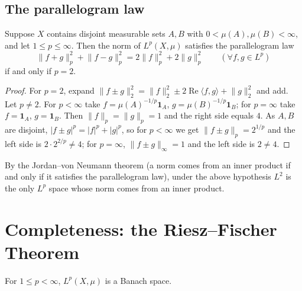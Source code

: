 \documentclass[11pt]{article}
\newcommand{\norm}[1]{\lVert #1\rVert}
\newcommand{\ind}{\mathbf{1}}
\begin{document}
\subsection{The parallelogram law}

\begin{proposition}\label{prop:parallelogram}
Suppose $X$ contains disjoint measurable sets $A,B$ with $0<\mu(A),\mu(B)<\infty$, and let $1\le p\le\infty$. Then the norm of $L^{p}(X,\mu)$ satisfies the parallelogram law
\[
\norm{f+g}_{p}^{2}+\norm{f-g}_{p}^{2}=2\norm{f}_{p}^{2}+2\norm{g}_{p}^{2}\qquad(\forall f,g\in L^{p})
\]
if and only if $p=2$.
\end{proposition}

\begin{proof}
For $p=2$, expand $\norm{f\pm g}_{2}^{2}=\norm{f}_{2}^{2}\pm2\operatorname{Re}\langle f,g\rangle+\norm{g}_{2}^{2}$ and add. Let $p\ne2$. For $p<\infty$ take $f=\mu(A)^{-1/p}\ind_{A}$, $g=\mu(B)^{-1/p}\ind_{B}$; for $p=\infty$ take $f=\ind_{A}$, $g=\ind_{B}$. Then $\norm{f}_{p}=\norm{g}_{p}=1$ and the right side equals $4$. As $A,B$ are disjoint, $|f\pm g|^{p}=|f|^{p}+|g|^{p}$, so for $p<\infty$ we get $\norm{f\pm g}_{p}=2^{1/p}$ and the left side is $2\cdot2^{2/p}\ne4$; for $p=\infty$, $\norm{f\pm g}_{\infty}=1$ and the left side is $2\ne4$.
\end{proof}

By the Jordan--von Neumann theorem (a norm comes from an inner product if and only if it satisfies the parallelogram law), under the above hypothesis $L^{2}$ is the only $L^{p}$ space whose norm comes from an inner product.

\section{Completeness: the Riesz--Fischer Theorem}

\begin{theorem}\label{thm:riesz-fischer}
For $1\le p<\infty$, $L^{p}(X,\mu)$ is a Banach space.
\end{theorem}
\end{document}
